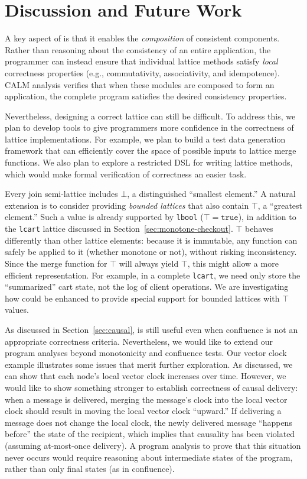 \section{Discussion and Future Work}
\label{sec:discussion}
A key aspect of \lang is that it enables the \emph{composition} of consistent
components. Rather than reasoning about the consistency of an entire
application, the programmer can instead ensure that individual lattice methods
satisfy \emph{local} correctness properties (e.g., commutativity, associativity,
and idempotence). CALM analysis verifies that when these modules are composed to
form an application, the complete program satisfies the desired consistency
properties.

Nevertheless, designing a correct lattice can still be difficult. To address
this, we plan to develop tools to give programmers more confidence in the
correctness of lattice implementations. For example, we plan to build a test
data generation framework that can efficiently cover the space of possible
inputs to lattice merge functions. We also plan to explore a restricted DSL for
writing lattice methods, which would make formal verification of correctness an
easier task.

Every join semi-lattice includes $\bot$, a distinguished ``smallest element.'' A natural
extension is to consider providing \emph{bounded lattices} that also contain   $\top$, a ``greatest
element.'' Such a value is already supported by \texttt{lbool} ($\top =
\mathtt{true}$), in addition to the \texttt{lcart} lattice discussed in
Section~\ref{sec:monotone-checkout}. $\top$ behaves differently than other
lattice elements: because it is immutable, any function can safely be applied to
it (whether monotone or not), without risking inconsistency. Since the merge
function for $\top$ will always yield $\top$, this might allow a more efficient
representation.  For example, in a complete \texttt{lcart}, we need only store the
``summarized'' cart state, not the log of client operations. We are
investigating how \lang could be enhanced to provide special support for
bounded lattices with $\top$ values.

As discussed in Section~\ref{sec:causal}, \lang is still useful even when
confluence is not an appropriate correctness criteria. Nevertheless, we would
like to extend our program analyses beyond monotonicity and confluence tests.
Our vector clock example illustrates some issues that merit further exploration.
As discussed, we can show that each node's local vector clock increases over
time. However, we would like to show something stronger to establish correctness
of causal delivery: when a message is delivered, merging the message's clock
into the local vector clock should result in moving the local vector clock
``upward.'' If delivering a message does not change the local clock, the newly
delivered message ``happens before'' the state of the recipient, which implies
that causality has been violated (assuming at-most-once delivery). A program
analysis to prove that this situation never occurs would require reasoning about
intermediate states of the program, rather than only final states (as in
confluence).

